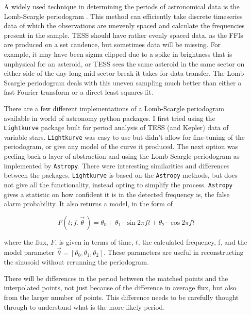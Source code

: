 \documentclass[12pt]{article}
\begin{document}
A widely used technique in determining the periods of astronomical data is the Lomb-Scargle periodogram \citep[\citet{Lomb1976,Scargle1982}, but see][for a review]{VanderPlas2018}.
This method can efficiently take discrete timeseries data of which the observations are unevenly spaced and calculate the frequencies present in the sample.
TESS should have rather evenly spaced data, as the FFIs are produced on a set candence, but sometimes data will be missing.
For example, it may have been sigma clipped due to a spike in brightness that is unphysical for an asteroid, or TESS sees the same asteroid in the same sector on either side of the day long mid-sector break it takes for data transfer.
The Lomb-Scargle periodogram deals with this uneven sampling much better than either a fast Fourier transform or a direct least squares fit.

There are a few different implementations of a Lomb-Scargle periodogram available in world of astronomy python packages.
I first tried using the \texttt{Lightkurve} \citep{Lightkurve2018} package built for period analysis of TESS (and Kepler) data of variable stars.
\texttt{Lightkurve} was easy to use but didn't allow for fine-tuning of the periodogram, or give any model of the curve it produced.
The next option was peeling back a layer of abstraction and using the Lomb-Scargle periodogram as implemented by \texttt{Astropy}\citep[\citet{Astropy2022} but see][for the implementation]{Vanderplas2012,Vanderplas2015}.
There were interesting similarities and differences between the packages.
\texttt{Lightkurve} is based on the \texttt{Astropy} methods, but does not give all the functionality, instead opting to simplify the process.
\texttt{Astropy} gives a statistic on how confident it is in the detected frequency is, the false alarm probability.
It also returns a model, in the form of

\begin{equation}
  \label{Eq:LCModel}
  F(t;f,\vec{\theta}\,) = \theta_0 + \theta_1\cdot\sin{2\pi ft} +\theta_2\cdot\cos{2\pi ft}
\end{equation}

where the flux, $F$, is given in terms of time, $t$, the calculated frequency, f, and the model parameter $\vec{\theta} = [\theta_0, \theta_1,\theta_2]$.
These parameters are useful in reconstructing the sinusoid without rerunning the periodogram.


There will be differences in the period between the matched points and the interpolated points, not just because of the difference in average flux, but also from the larger number of points. This difference needs to be carefully thought through to understand what is the more likely period.
\end{document}
